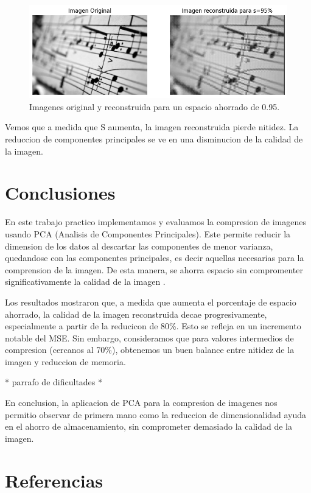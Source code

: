 \documentclass[a4paper,12pt]{article}
\numberwithin{equation}{section}
\numberwithin{figure}{section}
\begin{document}
\begin{figure}[H]
    \centering
    \includegraphics[width=1\textwidth]{Ejercicio 4b95.png}
    \caption{Imagenes original y reconstruida para un espacio ahorrado de 0.95.}
    \label{fig:ej4b5}
\end{figure}
Vemos que a medida que S aumenta, la imagen reconstruida pierde nitidez. La reduccion de 
componentes principales se ve en una disminucion de la calidad de la imagen. 

\section{Conclusiones}
En este trabajo practico implementamos y evaluamos la compresion de imagenes usando 
PCA (Analisis de Componentes Principales). Este permite reducir la dimension de los datos
al descartar las componentes de menor varianza, quedandose con las componentes principales, 
es decir aquellas necesarias para la comprension de la imagen. De esta manera, se ahorra espacio 
sin compromenter significativamente la calidad de la imagen .

Los resultados mostraron que, a medida que aumenta el porcentaje de espacio ahorrado, la calidad
de la imagen reconstruida decae progresivamente, especialmente a partir de la reducicon de 80\%. 
Esto se refleja en un incremento notable del MSE. Sin embargo, consideramos que
para valores intermedios de compresion (cercanos al 70\%), obtenemos un buen balance entre nitidez 
de la imagen y reduccion de memoria. 

* parrafo de dificultades *

En conclusion, la aplicacion de PCA para la compresion de imagenes nos permitio observar
de primera mano como la reduccion de dimensionalidad ayuda en el ahorro de almacenamiento,
sin comprometer demasiado la calidad de la imagen.




\section*{Referencias}


\end{document}

